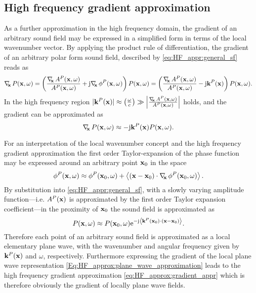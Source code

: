 \subsection{High frequency gradient approximation}
As a further approximation in the high frequency domain, the gradient of an arbitrary sound field may be expressed in a simplified form in terms of the local wavenumber vector.
By applying the product rule of differentiation, the gradient of an arbitrary polar form sound field, described by \eqref{eq:HF_appr:general_sf} reads as
\begin{equation}
\Dx P(\vx,\omega) = \left(  \frac{\Dx A^P(\vx,\omega)}{A^P(\vx,\omega)} + \ti \Dx \phi^P(\vx,\omega) \right) P(\vx,\omega) =  \left(  \frac{\Dx A^P(\vx,\omega)}{A^P(\vx,\omega)} - \ti \vk^P(\vx) \right) P(\vx,\omega).
\end{equation}
In the high frequency region $|\mathbf{k}^P(\mathbf{x})| \approx \left( \frac{\omega}{c} \right) \gg \left| \frac{ \nabla_{\!\!\mathbf{x}}\, A^P(\mathbf{x},\omega)}{A^P(\mathbf{x},\omega)} \right|$ holds, and the gradient can be approximated as
\begin{equation}
\nabla_{\!\!\mathbf{x}}\, P(\mathbf{x},\omega) \approx - \mathrm{j} \mathbf{k}^P(\mathbf{x}) P(\mathbf{x},\omega).
\label{eq:HF_approx:gradient_appr}
\end{equation}

\vspace{3mm}
For an interpretation of the local wavenumber concept and the high frequency gradient approximation the first order Taylor-expansion of the phase function may be expressed around an arbitrary point $\mathbf{x}_0$ in the space
\begin{equation}
\phi^P(\mathbf{x},\omega) \approx \phi^P(\mathbf{x}_0,\omega) + \left< (\mathbf{x}-\mathbf{x}_0) \cdot \nabla_{\!\!\mathbf{x}}\, \phi^P(\mathbf{x}_0,\omega) \right>.
\end{equation}
By substitution into \eqref{eq:HF_appr:general_sf}, with a slowly varying amplitude function---i.e. $A^P(\mathbf{x})$ is approximated by the first order Taylor expansion coefficient---in the proximity of $\mathbf{x}_0$ the sound field is approximated as
\begin{equation}
\label{Eq:HF_approx:plane_wave_approximation}
P(\mathbf{x},\omega) \approx P(\mathbf{x}_0,\omega) \mathrm{e}^{-\mathrm{j}  \left< \mathbf{k}^P(\mathbf{x}_0) \cdot \left( \mathbf{x} - \mathbf{x}_0 \right) \right>}.
\end{equation}
Therefore each point of an arbitrary sound field is approximated as a local elementary plane wave, with the wavenumber and angular frequency given by $\mathbf{k}^P(\mathbf{x})$ and $\omega$, respectively.
Furthermore expressing the gradient of the local plane wave representation \eqref{Eq:HF_approx:plane_wave_approximation} leads to the high frequency gradient approximation \eqref{eq:HF_approx:gradient_appr} which is therefore obviously the gradient of locally plane wave fields.

